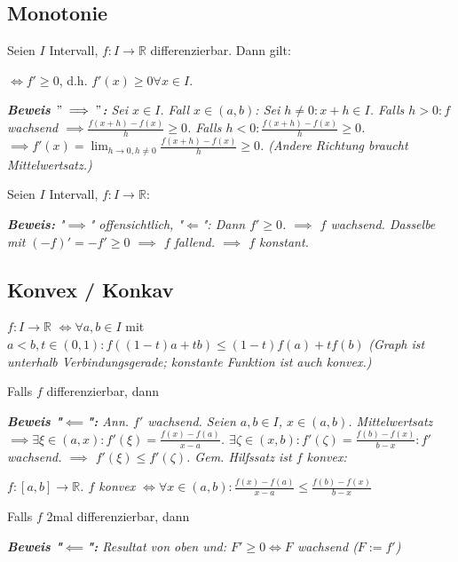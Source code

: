 \subsection{Monotonie}

Seien $I$ Intervall, $f: I \rightarrow \mathbb{R}$ differenzierbar. Dann gilt:

 $\Leftrightarrow f'\geq 0$, d.h. $f'(x) \geq 0 \forall x \in I$.

\textit{\textbf{Beweis $"\implies"$:} Sei $x \in I$. Fall $x \in (a,b)$: Sei $h\neq 0:x+h \in I$. Falls $h>0: f$ wachsend $\implies \frac{f(x+h)-f(x)}{h}\geq0$. Falls $h<0:\frac{f(x+h)-f(x)}{h}\geq 0$. $\implies f'(x)= \lim_{h \rightarrow 0, h \neq 0}\frac{f(x+h)-f(x)}{h}\geq 0$. (Andere Richtung braucht Mittelwertsatz.)}

Seien $I$ Intervall, $f: I \rightarrow \mathbb{R}$:  

\textit{\textbf{Beweis:} "$\implies$" offensichtlich, "$\Leftarrow$": Dann $f'\geq 0$. $\implies$ $f$ wachsend. Dasselbe mit $(-f)'=-f' \geq 0$ $\implies$ $f$ fallend. $\implies$ $f$ konstant.}

\subsection{Konvex / Konkav}

$f: I \rightarrow \mathbb{R}$  $\Leftrightarrow \forall a,b \in I$ mit $a<b, t \in (0,1): f((1-t)a+tb)\leq (1-t)f(a)+tf(b)$ \textit{(Graph ist unterhalb Verbindungsgerade; konstante Funktion ist auch konvex.)}

Falls $f$ differenzierbar, dann 

\textit{\textbf{Beweis "$\impliedby$":} Ann. $f'$ wachsend. Seien $a,b \in I$, $x \in (a,b)$. Mittelwertsatz $\implies \exists \xi \in (a,x): f'(\xi) = \frac{f(x) -f(a)}{x-a}$. $\exists \zeta \in (x,b): f'(\zeta)=\frac{f(b)-f(x)}{b-x}: f'$ wachsend. $\implies$ $f'(\xi) \leq f'(\zeta)$. Gem. Hilfssatz ist $f$ konvex:}

\textit{$f:[a,b] \rightarrow \mathbb{R}$. $f$ konvex $\iff \forall x \in (a,b): \frac{f(x)-f(a)}{x-a}\leq \frac{f(b)-f(x)}{b-x}$}

Falls $f$ 2mal differenzierbar, dann 

\textit{\textbf{Beweis "$\impliedby$":} Resultat von oben und: $F'\geq 0 \iff F$ wachsend ($F:=f'$)}

